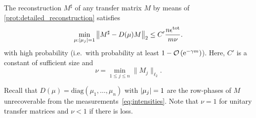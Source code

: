 \begin{corollary}
  \label{cor:noisy_performance_guarantee}
  The reconstruction ${M}^\sharp$ of any transfer matrix ${M}$ by means of \cref{prot:detailed_reconstruction} satisfies
    \begin{equation}
      \min_{{\mu}: {\vert\mu_j\vert} = 1} \left\|  {M}^\sharp -  {D} ({\mu}) {M} \right\|_2
      \leq C' \frac{n \epsilon^\mathrm{tot}}{m \nu}.
      \label{eq:noisy_reconstruction_total_bound}
    \end{equation}
  with high probability (i.e.\ with probability at least $1 - {\mathcal{O}} \left( \mathrm{e}^{-\gamma m}\right)$).
  Here, $C'$ is a constant of sufficient size and
  \begin{equation}
    \nu = \min_{1 \leq j \leq n} \| {M}_j \|_{\ell_2}.
    \label{eq:definition_normconst}
  \end{equation}
\end{corollary}
Recall that ${D}(\mu) = \mathrm{diag}(\mu_1, \ldots, \mu_n)$ with ${\vert\mu_j\vert} = 1$ are the row-phases of ${M}$ unrecoverable from the measurements~\eqref{eq:intensities}.
Note that $\nu = 1$ for unitary transfer matrices and $\nu < 1$ if there is loss.

